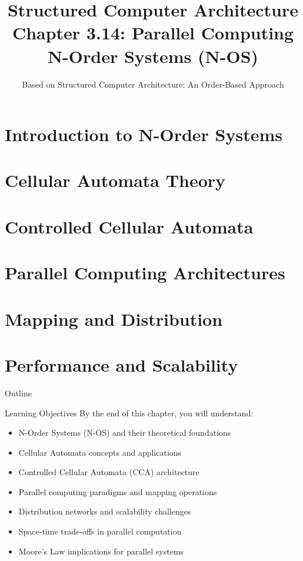 \documentclass[aspectratio=169]{beamer}
\title[Chapter 3.14: Parallel Computing]{Structured Computer Architecture\\Chapter 3.14: Parallel Computing\\N-Order Systems (N-OS)}
\author{Based on Structured Computer Architecture: An Order-Based Approach}
\date{}
\begin{document}
\begin{frame}
\titlepage
\end{frame}

\setcounter{section}{0}

\section{Introduction to N-Order Systems}
\section{Cellular Automata Theory}
\section{Controlled Cellular Automata}
\section{Parallel Computing Architectures}
\section{Mapping and Distribution}
\section{Performance and Scalability}

\begin{frame}{Outline}
\tableofcontents
\end{frame}

\begin{frame}{Learning Objectives}
By the end of this chapter, you will understand:
\begin{itemize}
\item N-Order Systems (N-OS) and their theoretical foundations
\item Cellular Automata concepts and applications
\item Controlled Cellular Automata (CCA) architecture
\item Parallel computing paradigms and mapping operations
\item Distribution networks and scalability challenges
\item Space-time trade-offs in parallel computation
\item Moore's Law implications for parallel systems
\end{itemize}
\end{frame}
\end{document}
